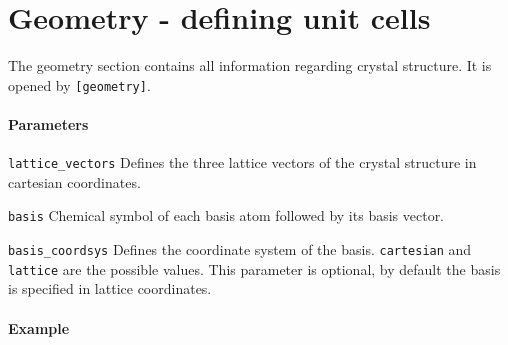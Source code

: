 \section{Geometry - defining unit cells} 
The geometry section contains all information regarding crystal structure. It is opened by \lstinline{[geometry]}.

\paragraph{Parameters}

\begin{description}
 \item{\lstinline{lattice_vectors}} Defines the three lattice vectors of the crystal structure in cartesian coordinates.
 \item{\lstinline{basis}} Chemical symbol of each basis atom followed by its basis vector.
 \item{\lstinline{basis_coordsys}} Defines the coordinate system of the basis. \lstinline{cartesian} and \lstinline{lattice} are the possible values. This parameter is optional, by default the basis is specified in lattice coordinates.
\end{description}

\paragraph{Example}\


